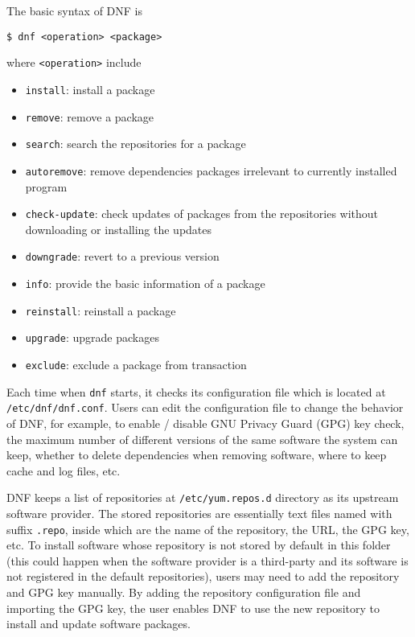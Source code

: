 The basic syntax of DNF is
\begin{lstlisting}
$ dnf <operation> <package>
\end{lstlisting}
where \verb|<operation>| include
\begin{itemize}
	\item \verb|install|: install a package
	\item \verb|remove|: remove a package
	\item \verb|search|: search the repositories for a package
	\item \verb|autoremove|: remove dependencies packages irrelevant to currently installed program
	\item \verb|check-update|: check updates of packages from the repositories without downloading or installing the updates
	\item \verb|downgrade|: revert to a previous version
	\item \verb|info|: provide the basic information of a package
	\item \verb|reinstall|: reinstall a package
	\item \verb|upgrade|: upgrade packages
	\item \verb|exclude|: exclude a package from transaction
\end{itemize}

Each time when \verb|dnf| starts, it checks its configuration file which is located at \verb|/etc/dnf/dnf.conf|. Users can edit the configuration file to change the behavior of DNF, for example, to enable / disable GNU Privacy Guard (GPG) key check, the maximum number of different versions of the same software the system can keep, whether to delete dependencies when removing software, where to keep cache and log files, etc.

DNF keeps a list of repositories at \verb|/etc/yum.repos.d| directory as its upstream software provider. The stored repositories are essentially text files named with suffix \verb|.repo|, inside which are the name of the repository, the URL, the GPG key, etc. To install software whose repository is not stored by default in this folder (this could happen when the software provider is a third-party and its software is not registered in the default repositories), users may need to add the repository and GPG key manually. By adding the repository configuration file and importing the GPG key, the user enables DNF to use the new repository to install and update software packages.

